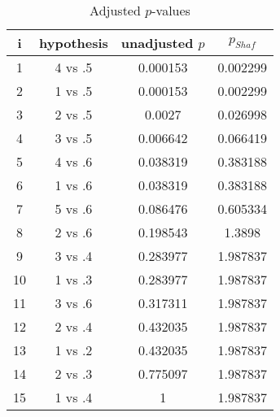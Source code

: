 \documentclass[a4paper,10pt]{article}
\begin{document}
\begin{landscape}
\begin{table}[!htp]
\centering\scriptsize
\begin{tabular}{cccc}
i&hypothesis&unadjusted $p$&$p_{Shaf}$\\
\hline1&4 vs .5&0.000153&0.002299\\
2&1 vs .5&0.000153&0.002299\\
3&2 vs .5&0.0027&0.026998\\
4&3 vs .5&0.006642&0.066419\\
5&4 vs .6&0.038319&0.383188\\
6&1 vs .6&0.038319&0.383188\\
7&5 vs .6&0.086476&0.605334\\
8&2 vs .6&0.198543&1.3898\\
9&3 vs .4&0.283977&1.987837\\
10&1 vs .3&0.283977&1.987837\\
11&3 vs .6&0.317311&1.987837\\
12&2 vs .4&0.432035&1.987837\\
13&1 vs .2&0.432035&1.987837\\
14&2 vs .3&0.775097&1.987837\\
15&1 vs .4&1&1.987837\\
\hline
\end{tabular}
\caption{Adjusted $p$-values}
\end{table}

\end{landscape}
\end{document}
